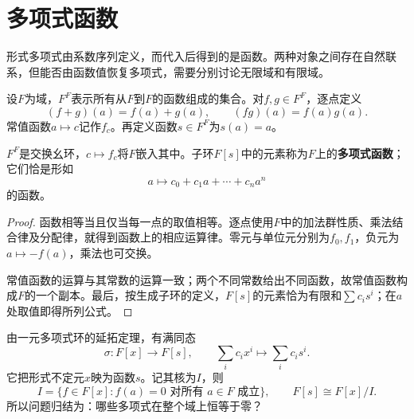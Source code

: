 \section{多项式函数}

形式多项式由系数序列定义，而代入后得到的是函数。两种对象之间存在自然联系，但能否由函数值恢复多项式，需要分别讨论无限域和有限域。

\begin{definition}
设$F$为域，$F^F$表示所有从$F$到$F$的函数组成的集合。对$f,g\in F^F$，逐点定义
\[
(f+g)(a)=f(a)+g(a),\qquad(fg)(a)=f(a)g(a).
\]
常值函数$a\mapsto c$记作$f_c$。再定义函数$s\in F^F$为$s(a)=a$。
\end{definition}

\begin{proposition}
$F^F$是交换幺环，$c\mapsto f_c$将$F$嵌入其中。子环$F[s]$中的元素称为$F$上的\textbf{多项式函数}；它们恰是形如
\[
a\longmapsto c_0+c_1a+\cdots+c_na^n
\]
的函数。
\end{proposition}
\begin{proof}
函数相等当且仅当每一点的取值相等。逐点使用$F$中的加法群性质、乘法结合律及分配律，就得到函数上的相应运算律。零元与单位元分别为$f_0,f_1$，负元为$a\mapsto-f(a)$，乘法也可交换。

常值函数的运算与其常数的运算一致；两个不同常数给出不同函数，故常值函数构成$F$的一个副本。最后，按生成子环的定义，$F[s]$的元素恰为有限和$\sum c_i s^i$；在$a$处取值即得所列公式。
\end{proof}

由一元多项式环的延拓定理，有满同态
\[
\sigma:F[x]\longrightarrow F[s],\qquad
\sum_i c_i x^i\longmapsto\sum_i c_i s^i.
\]
它把形式不定元$x$映为函数$s$。记其核为$I$，则
\[
I=\{f\in F[x]:f(a)=0\text{ 对所有 }a\in F\text{ 成立}\},
\qquad F[s]\cong F[x]/I.
\]
所以问题归结为：哪些多项式在整个域上恒等于零？

